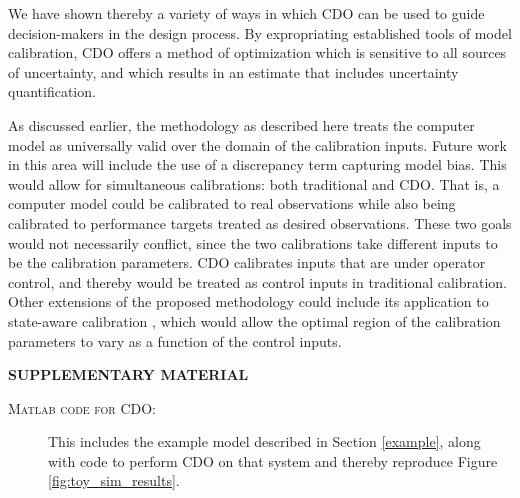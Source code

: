 \documentclass[12pt]{article}
\begin{document}
We have shown thereby a variety of ways in which CDO can be used to guide decision-makers in the design process. 
%
By expropriating established tools of model calibration, CDO offers a method of optimization which is sensitive to all sources of uncertainty, and which results in an estimate that includes uncertainty quantification.

As discussed earlier, the methodology as described here treats the computer model as universally valid over the domain of the calibration inputs. 
%
Future work in this area will include the use of a discrepancy term capturing model bias.
%
This would allow for simultaneous calibrations: both traditional and CDO.
%
That is, a computer model could be calibrated to real observations while also being calibrated to performance targets treated as desired observations.
%
These two goals would not necessarily conflict, since the two calibrations take different inputs to be the calibration parameters.
% 
CDO calibrates inputs that are under operator control, and thereby would be treated as control inputs in traditional calibration.
%
Other extensions of the proposed methodology could include its application to state-aware calibration \citep{Atamturktur2015,Stevens2018,Brown2016}, which would allow the optimal region of the calibration parameters to vary as a function of the control inputs.



\bigskip
\begin{center}
{\large\bf SUPPLEMENTARY MATERIAL}
\end{center}

\begin{description}


\item[\scshape{Matlab} code for CDO:] This includes the example model described in Section \ref{example}, along with code to perform CDO on that system and thereby reproduce Figure \ref{fig:toy_sim_results}.


%

\end{description}




\end{document}
